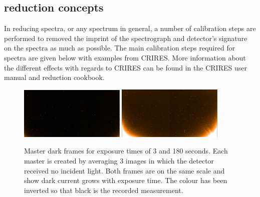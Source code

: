 \subsection{\nir{} reduction concepts}
\label{subsec:nirreduction}
In reducing \nir{} spectra, or any spectrum in general, a number of calibration steps are performed to removed the imprint of the spectrograph and detector's signature on the spectra as much as possible.
The main calibration steps required for \nir{} spectra are given below with examples from {CRIRES}.
More information about the different effects with regards to CRIRES can be found in the CRIRES user manual and reduction cookbook.
\begin{figure}[h]
    \centering
    \includegraphics[width=0.45\textwidth]{figures/reduction/MasterDarkFlat_1.png}
    \includegraphics[width=0.45\textwidth]{figures/reduction/MasterDarkSpec_1.png}
    \caption[Example dark frames for different exposure times.]{Master dark frames for exposure times of 3 and 180 seconds.
Each master is created by averaging 3 images in which the detector received no incident light.
Both frames are on the same scale and show dark current grows with exposure time.
The colour has been inverted so that black is the recorded measurement.}
    \label{fig:darkcurrent_colour}
\end{figure}

